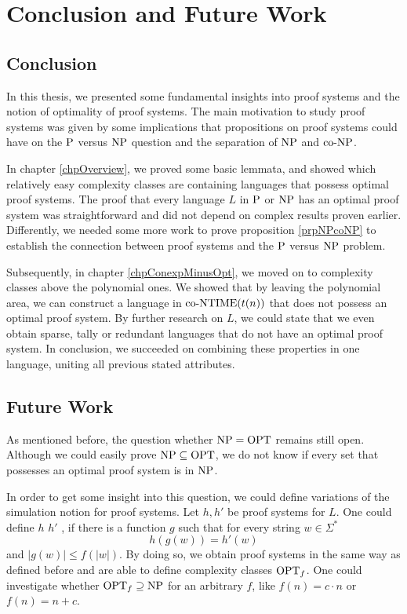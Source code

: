 \chapter{Conclusion and Future Work}
  
  \section{Conclusion}
  
  In this thesis, we presented some fundamental insights into proof systems and the notion of optimality of proof systems. The main motivation to study proof systems was given by some implications that propositions on proof systems could have on the \(\P\) versus \(\NP\) question and the separation of \(\NP\) and \(\coNP\).
  
  In chapter \ref{chpOverview}, we proved some basic lemmata, and showed which relatively easy complexity classes are containing languages that possess optimal proof systems. The proof that every language \(L\) in \(\P\) or \(\NP\) has an optimal proof system was straightforward and did not depend on complex results proven earlier. Differently, we needed some more work to prove proposition \ref{prpNPcoNP} to establish the connection between proof systems and the \(\P\) versus \(\NP\) problem.
  
  Subsequently, in chapter \ref{chpConexpMinusOpt}, we moved on to complexity classes above the polynomial ones. We showed that by leaving the polynomial area, we can construct a language in \(\coNTIME(t(n))\) that does not possess an optimal proof system. By further research on \(L\), we could state that we even obtain sparse, tally or redundant languages that do not have an optimal proof system. In conclusion, we succeeded on combining these properties in one language, uniting all previous stated attributes.
  
  \section{Future Work}

  As mentioned before, the question whether \(\NP = \OPT\) remains still open. Although we could easily prove \(\NP \subseteq \OPT\), we do not know if every set that possesses an optimal proof system is in \(\NP\).
  
  In order to get some insight into this question, we could define variations of the simulation notion for proof systems. Let \(h, h'\) be proof systems for \(L\). One could define \(h\)  \(h'\) , if there is a function \(g\) such that for every string \(w \in \Sigma^*\)
  \[
    h(g(w)) = h'(w)
  \]
  and \(|g(w)| \leq f(|w|)\). By doing so, we obtain  proof systems in the same way as defined before and are able to define complexity classes \(\OPT_f\). One could investigate whether \(\OPT_f \supseteq \NP\) for an arbitrary \(f\), like \(f(n) = c \cdot n\) or \(f(n) = n + c\).